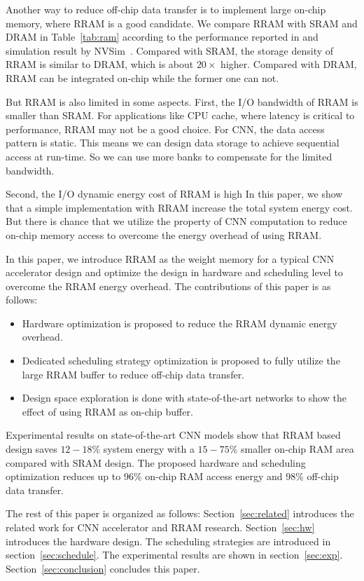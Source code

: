 Another way to reduce off-chip data transfer is to implement large on-chip memory, where RRAM is a good candidate. We compare RRAM with SRAM and DRAM in Table~\ref{tab:ram} according to the performance reported in \cite{ee598, fackenthal201419} and simulation result by NVSim~\cite{dong2014nvsim}. Compared with SRAM, the storage density of RRAM is similar to DRAM, which is about $20\times$ higher. Compared with DRAM, RRAM can be integrated on-chip while the former one can not.



But RRAM is also limited in some aspects. First, the I/O bandwidth of RRAM is smaller than SRAM. For applications like CPU cache, where latency is critical to performance, RRAM may not be a good choice. For CNN, the data access pattern is static. This means we can design data storage to achieve sequential access at run-time. So we can use more banks to compensate for the limited bandwidth.

Second, the I/O dynamic energy cost of RRAM is high In this paper, we show that a simple implementation with RRAM increase the total system energy cost. But there is chance that we utilize the property of CNN computation to reduce on-chip memory access to overcome the energy overhead of using RRAM. 

In this paper, we introduce RRAM as the weight memory for a typical CNN accelerator design and optimize the design in hardware and scheduling level to overcome the RRAM energy overhead. The contributions of this paper is as follows:
\begin{itemize}
\item {Hardware optimization is proposed to reduce the RRAM dynamic energy overhead.}
\item {Dedicated scheduling strategy optimization is proposed to fully utilize the large RRAM buffer to reduce off-chip data transfer.}
\item {Design space exploration is done with state-of-the-art networks to show the effect of using RRAM as on-chip buffer.}
\end{itemize}
Experimental results on state-of-the-art CNN models show that RRAM based design saves $12-18\%$ system energy with a $15-75\%$ smaller on-chip RAM area compared with SRAM design. The proposed hardware and scheduling optimization reduces up to 96\% on-chip RAM access energy and 98\% off-chip data transfer.

The rest of this paper is organized as follows: Section~\ref{sec:related} introduces the related work for CNN accelerator and RRAM research. Section~\ref{sec:hw} introduces the hardware design. The scheduling strategies are introduced in section~\ref{sec:schedule}. The experimental results are shown in section~\ref{sec:exp}. Section~\ref{sec:conclusion} concludes this paper.